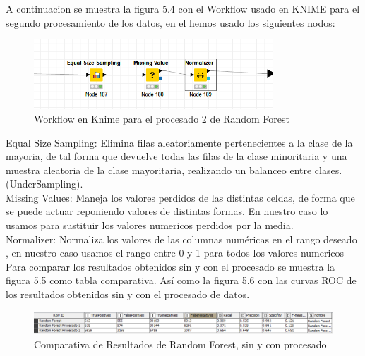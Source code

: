 	A continuacion se muestra la figura 5.4 con el Workflow usado en KNIME para el segundo procesamiento de los datos, en el hemos usado los siguientes nodos: \\
	
	\begin{figure}[htb]
		\centering
		\includegraphics[width=0.8\textwidth]{./imagenes/61}
		\caption{Workflow en Knime para el procesado 2 de Random Forest} \label{fig:1}
	\end{figure}
	
	Equal Size Sampling: Elimina filas aleatoriamente pertenecientes a la clase de la mayoria, de tal forma que devuelve todas las filas de la clase minoritaria y una muestra aleatoria de la clase mayoritaria, realizando un balanceo entre clases. (UnderSampling). \\
	
	Missing Values: Maneja los valores perdidos de las distintas celdas, de forma que se puede actuar reponiendo valores de distintas formas. En nuestro caso lo usamos para sustituir los valores numericos perdidos por la media.\\
	
	Normalizer: Normaliza los valores de las columnas numéricas en el rango deseado , en nuestro caso usamos el rango entre 0 y 1 para todos los valores numericos \\
	
	Para comparar los resultados obtenidos sin y con el procesado se muestra la figura 5.5 como tabla comparativa. Así como la figura 5.6 con las curvas ROC de los resultados obtenidos sin y con el procesado de datos.
	
	\begin{figure}[htb]
		\centering
		\includegraphics[width=1.0\textwidth]{./imagenes/62}
		\caption{Comparativa de Resultados de Random Forest, sin y con procesado} \label{fig:1}
	\end{figure}
	
